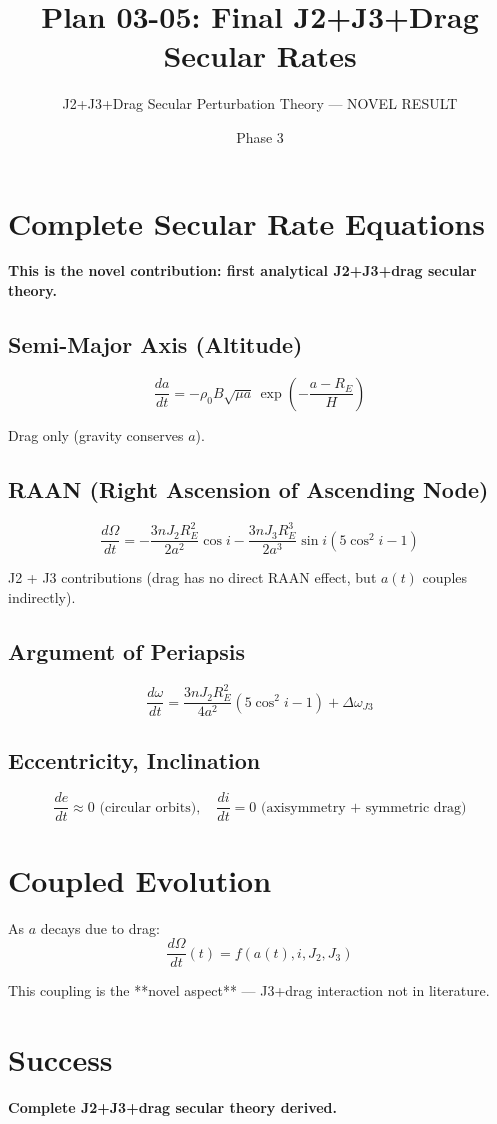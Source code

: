 \documentclass[11pt]{article}
\title{Plan 03-05: Final J2+J3+Drag Secular Rates}
\author{J2+J3+Drag Secular Perturbation Theory — NOVEL RESULT}
\date{Phase 3}
\begin{document}
\maketitle

\section{Complete Secular Rate Equations}

\textbf{This is the novel contribution: first analytical J2+J3+drag secular theory.}

\subsection{Semi-Major Axis (Altitude)}

$$\boxed{\frac{da}{dt} = -\rho_0 B\sqrt{\mu a}\,\exp\left(-\frac{a - R_E}{H}\right)}$$

Drag only (gravity conserves $a$).

\subsection{RAAN (Right Ascension of Ascending Node)}

$$\boxed{\frac{d\Omega}{dt} = -\frac{3 n J_2 R_E^2}{2 a^2}\cos i - \frac{3 n J_3 R_E^3}{2 a^3}\sin i(5\cos^2 i - 1)}$$

J2 + J3 contributions (drag has no direct RAAN effect, but $a(t)$ couples indirectly).

\subsection{Argument of Periapsis}

$$\boxed{\frac{d\omega}{dt} = \frac{3 n J_2 R_E^2}{4 a^2}(5\cos^2 i - 1) + \Delta\omega_{J3}}$$

\subsection{Eccentricity, Inclination}

$$\frac{de}{dt} \approx 0 \text{ (circular orbits)}, \quad \frac{di}{dt} = 0 \text{ (axisymmetry + symmetric drag)}$$

\section{Coupled Evolution}

As $a$ decays due to drag:
$$\frac{d\Omega}{dt}(t) = f(a(t), i, J_2, J_3)$$

This coupling is the **novel aspect** — J3+drag interaction not in literature.

\section{Success}
\textbf{Complete J2+J3+drag secular theory derived.}
\end{document}
